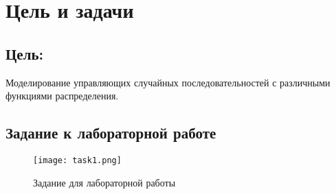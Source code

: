 \chapter{Цель и задачи}
\label{ch:intro}

\section*{\textbf{Цель:}} 

Моделирование управляющих случайных последовательностей с различными функциями распределения.

\section*{Задание к лабораторной работе}

\begin{figure}[H]
    \centering
    \texttt{[image: task1.png]}
    \caption{Задание для лабораторной работы}
\end{figure}


\endinput